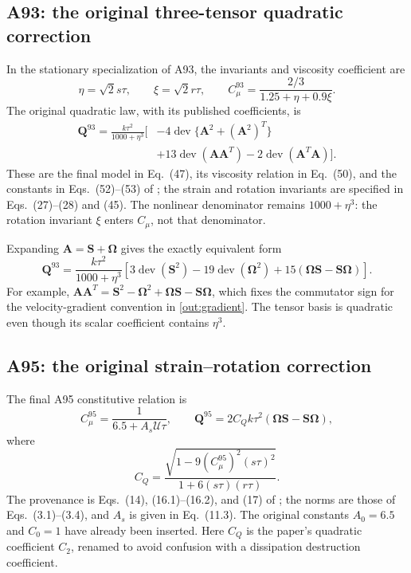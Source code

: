 \documentclass[11pt,a4paper]{article}
\numberwithin{equation}{section}
\newcommand{\Q}{\boldsymbol Q}
\newcommand{\Amat}{\boldsymbol A}
\newcommand{\Smat}{\boldsymbol S}
\newcommand{\Omat}{\boldsymbol\Omega}
\DeclareMathOperator{\dev}{dev}
\begin{document}
\subsection{A93: the original three-tensor quadratic correction}
\label{out:A93}

In the stationary specialization of A93, the invariants and viscosity
coefficient are
\begin{equation}
 \eta=\sqrt2s\tau,\qquad \xi=\sqrt2r\tau,\qquad
 \boxed{C_\mu^{93}=\frac{2/3}{1.25+\eta+0.9\xi}.}
 \label{out:A93C}
\end{equation}
The original quadratic law, with its published coefficients, is
\begin{equation}
\begin{split}
 \Q^{93}=\frac{k\tau^2}{1000+\eta^3}\big[&
 -4\dev\{\Amat^2+(\Amat^2)^T\}\\
 &+13\dev(\Amat\Amat^T)-2\dev(\Amat^T\Amat)\big].
\end{split}
\label{out:A93QA}
\end{equation}
These are the final model in Eq.~(47), its viscosity relation in
Eq.~(50), and the constants in Eqs.~(52)--(53) of
\citet{Shih1993}; the strain and rotation invariants are specified
in Eqs.~(27)--(28) and (45). The nonlinear denominator remains
$1000+\eta^3$: the rotation invariant $\xi$ enters $C_\mu$, not that
denominator.

Expanding $\Amat=\Smat+\Omat$ gives the exactly equivalent form
\begin{equation}
 \boxed{
 \Q^{93}=\frac{k\tau^2}{1000+\eta^3}
 \left[3\dev(\Smat^2)-19\dev(\Omat^2)
       +15(\Omat\Smat-\Smat\Omat)\right].}
 \label{out:A93Q}
\end{equation}
For example,
$\Amat\Amat^T=\Smat^2-\Omat^2+
\Omat\Smat-\Smat\Omat$, which fixes the commutator sign for the
velocity-gradient convention in \cref{out:gradient}. The tensor basis
is quadratic even though its scalar coefficient contains $\eta^3$.

\subsection{A95: the original strain--rotation correction}
\label{out:A95}

The final A95 constitutive relation is
\begin{equation}
 \boxed{C_\mu^{95}=\frac1{6.5+A_s\mathcal U\tau},\qquad
 \Q^{95}=2C_Qk\tau^2(\Omat\Smat-\Smat\Omat),}
 \label{out:A95law}
\end{equation}
where
\begin{equation}
 C_Q=\frac{\sqrt{1-9(C_\mu^{95})^2(s\tau)^2}}
               {1+6(s\tau)(r\tau)}.
 \label{out:CQ}
\end{equation}
The provenance is Eqs.~(14), (16.1)--(16.2), and (17) of
\citet{Shih1995ASM}; the norms are those of Eqs.~(3.1)--(3.4),
and $A_s$ is given in Eq.~(11.3). The original constants
$A_0=6.5$ and $C_0=1$ have already been inserted.
Here $C_Q$ is the paper's quadratic coefficient $C_2$, renamed to
avoid confusion with a dissipation destruction coefficient.
\end{document}
